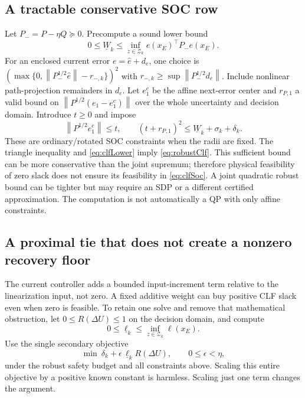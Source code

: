 \documentclass[10pt,letterpaper]{article}
\newcommand{\Z}{\mathcal Z}
\newcommand{\norm}[1]{\left\lVert#1\right\rVert}
\begin{document}
\subsection{A tractable conservative SOC row}
Let $P_-=P-\eta Q\succeq0$. Precompute a sound lower bound
\begin{equation}\label{eq:clfLower}
0\le\underline W_k\le\inf_{z\in\Z_k}e(x_E)^\top P_-e(x_E).
\end{equation}
For an enclosed current error $e=\hat e+d_e$,
one choice is $(\max\{0,\norm{P_-^{1/2}\hat e}-r_{-,k}\})^2$ with
$r_{-,k}\ge\sup\norm{P_-^{1/2}d_e}$. Include nonlinear path-projection
remainders in $d_e$. Let $e_1^c$ be the affine next-error center and
$r_{P,1}$ a valid bound on $\norm{P^{1/2}(e_1-e_1^c)}$ over the whole
uncertainty and decision domain. Introduce $t\ge0$ and impose
\begin{equation}\label{eq:clfSoc}
\norm{P^{1/2}e_1^c}\le t,\qquad
(t+r_{P,1})^2\le\underline W_k+\sigma_k+\delta_k.
\end{equation}
These are ordinary/rotated SOC constraints when the radii are fixed. The
triangle inequality and \eqref{eq:clfLower} imply \eqref{eq:robustClf}.
This sufficient bound can be more conservative than the joint supremum;
therefore physical feasibility of zero slack does not ensure its feasibility
in \eqref{eq:clfSoc}. A joint quadratic robust bound can be tighter but may
require an SDP or a different certified approximation. The computation is not
automatically a QP with only affine constraints.

\subsection{A proximal tie that does not create a nonzero recovery floor}
The current controller adds a bounded input-increment term relative to the
linearization input, not zero. A fixed additive weight can buy positive CLF
slack even when zero is feasible. To retain one solve and remove that
mathematical obstruction, let $0\le R(\Delta U)\le1$ on the decision domain,
and compute
\begin{equation}\label{eq:ellLower}
0\le\underline\ell_k\le\inf_{z\in\Z_k}\ell(x_E).
\end{equation}
Use the single secondary objective
\begin{equation}\label{eq:objective}
\boxed{\min\ \delta_k+\epsilon\,\underline\ell_k R(\Delta U),
\qquad 0\le\epsilon<\eta,}
\end{equation}
under the robust safety budget and all constraints above. Scaling this entire
objective by a positive known constant is harmless. Scaling just one term
changes the argument.
\end{document}
